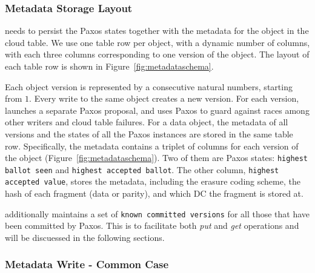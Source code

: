 \subsubsection{Metadata Storage Layout}

\name needs to persist the Paxos states together with the metadata for the object in the cloud table. 
We use one table row per object, with a dynamic number of columns, with each three columns corresponding to one version of the object. The layout of each table row is
shown in Figure~\ref{fig:metadataschema}.

Each object version is represented by a consecutive natural numbers, starting
from $1$. Every \name write to the same object creates a new version. For each
version, \name launches a separate Paxos proposal, and uses Paxos to guard
against races among other \name writers and cloud table failures. For a data
object, the metadata of all versions and the states of all the Paxos instances
are stored in the same table row. Specifically, the metadata contains a triplet
of columns for each version of the object (Figure~\ref{fig:metadataschema}). Two
of them are Paxos states: {\tt highest ballot seen} and {\tt highest accepted
  ballot}. The other column, {\tt highest accepted value}, stores the metadata,
including the erasure coding scheme, the hash of each fragment (data or parity),
and which DC the fragment is stored at.

{\name} additionally maintains a set of {\tt known committed versions} for all
those that have been committed by Paxos. This is to facilitate both {\em put}
and {\em get} operations and will be discuessed in the following sections.

\subsubsection{Metadata Write - Common Case}


